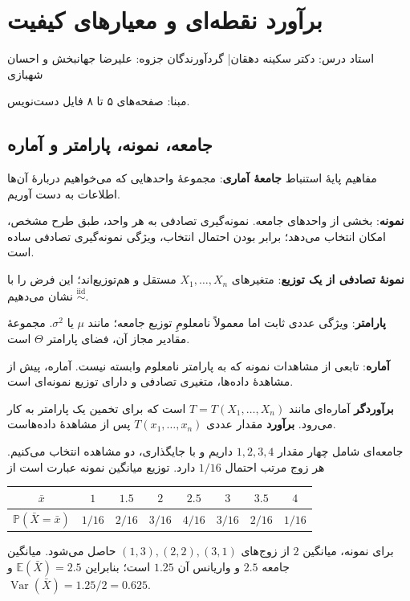 \documentclass[12pt,a4paper,oneside]{report}
\newcounter{ex}[chapter]
\newenvironment{example}[1]{\refstepcounter{ex}\begin{tcolorbox}[breakable=false,title={مثال \thechapter.\arabic{ex} | #1},colframe=muted,colback=white]}{\end{tcolorbox}}
\newcommand{\source}[1]{\par{\small\color{muted} مبنا: صفحه‌های #1 فایل دست‌نویس.}\par}
\newcommand{\E}{\mathbb E}
\newcommand{\Var}{\operatorname{Var}}
\newcommand{\iid}{\overset{\mathrm{iid}}{\sim}}
\newcommand{\Prob}{\mathbb P}
\begin{document}
\setcounter{chapter}{1}
\chapter{برآورد نقطه‌ای و معیارهای کیفیت}
\begin{center}{\small\color{muted} استاد درس: دکتر سکینه دهقان\quad | \quad گردآورندگان جزوه: علیرضا جهانبخش و احسان شهبازی}\end{center}

\source{۵ تا ۸}
\section{جامعه، نمونه، پارامتر و آماره}
\begin{definition}{مفاهیم پایهٔ استنباط}
\textbf{جامعهٔ آماری}: مجموعهٔ واحدهایی که می‌خواهیم دربارهٔ آن‌ها اطلاعات به دست آوریم.

\textbf{نمونه}: بخشی از واحدهای جامعه. نمونه‌گیری تصادفی به هر واحد، طبق طرح مشخص، امکان انتخاب می‌دهد؛ برابر بودن احتمال انتخاب، ویژگی نمونه‌گیری تصادفی ساده است.

\textbf{نمونهٔ تصادفی از یک توزیع}: متغیرهای $X_1,\ldots,X_n$ مستقل و هم‌توزیع‌اند؛ این فرض را با $\iid$ نشان می‌دهیم.

\textbf{پارامتر}: ویژگی عددی ثابت اما معمولاً نامعلومِ توزیع جامعه؛ مانند $\mu$ یا $\sigma^2$. مجموعهٔ مقادیر مجاز آن، فضای پارامتر $\Theta$ است.

\textbf{آماره}: تابعی از مشاهدات نمونه که به پارامتر نامعلوم وابسته نیست. آماره، پیش از مشاهدهٔ داده‌ها، متغیری تصادفی و دارای توزیع نمونه‌ای است.
\end{definition}
\textbf{برآوردگر} آماره‌ای مانند $T=T(X_1,\ldots,X_n)$ است که برای تخمین یک پارامتر به کار می‌رود. \textbf{برآورد} مقدار عددی $T(x_1,\ldots,x_n)$ پس از مشاهدهٔ داده‌هاست.
\begin{example}{توزیع نمونه‌ای میانگین}
جامعه‌ای شامل چهار مقدار $1,2,3,4$ داریم و با جایگذاری، دو مشاهده انتخاب می‌کنیم. هر زوج مرتب احتمال $1/16$ دارد. توزیع میانگین نمونه عبارت است از
\begin{center}\small
\begin{tabular}{c|ccccccc}
\toprule
$\bar x$&$1$&$1.5$&$2$&$2.5$&$3$&$3.5$&$4$\\
\midrule
$\Prob(\bar X=\bar x)$&$1/16$&$2/16$&$3/16$&$4/16$&$3/16$&$2/16$&$1/16$\\
\bottomrule
\end{tabular}\end{center}
برای نمونه، میانگین $2$ از زوج‌های $(1,3),(2,2),(3,1)$ حاصل می‌شود. میانگین جامعه $2.5$ و واریانس آن $1.25$ است؛ بنابراین $\E(\bar X)=2.5$ و $\Var(\bar X)=1.25/2=0.625$.
\end{example}
\end{document}
